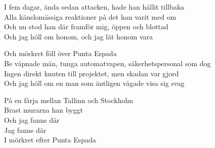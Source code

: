\begin{lyrics}
I fem dagar, ända sedan attacken, hade han hållit tillbaka\\
Alla känslomässiga reaktioner på det han varit med om\\
Och nu stod han där framför mig, öppen och blottad\\
Och jag höll om honom, och jag lät honom vara

Och mörkret föll över Punta Espada\\
Be väpnade män, tunga automatvapen, säkerhetspersonal som dog\\
Ingen direkt knuten till projektet, men skadan var gjord\\
Och jag höll om en man som äntligen vågade visa sig svag

På en färja mellan Tallinn och Stockholm\\
Brast murarna han byggt\\
Och jag fanns där\\
Jag fanns där\\
I mörkret efter Punta Espada
\end{lyrics}

